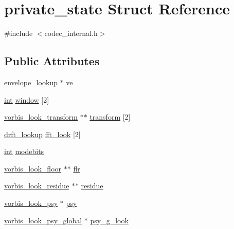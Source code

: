\hypertarget{structprivate__state}{}\section{private\+\_\+state Struct Reference}
\label{structprivate__state}


{\ttfamily \#include $<$codec\+\_\+internal.\+h$>$}

\subsection*{Public Attributes}
\begin{DoxyCompactItemize}
\item 
\hyperlink{structenvelope__lookup}{envelope\+\_\+lookup} $\ast$ \hyperlink{structprivate__state_ad7979389aacc2e53e24e8d96325809ac}{ve}
\item 
\hyperlink{xmltok_8h_a5a0d4a5641ce434f1d23533f2b2e6653}{int} \hyperlink{structprivate__state_af9be5f1a2c234d8fed9119b44b691876}{window} \mbox{[}2\mbox{]}
\item 
\hyperlink{codec__internal_8h_aa6baacf2249071bb7fbccedb526ea4bb}{vorbis\+\_\+look\+\_\+transform} $\ast$$\ast$ \hyperlink{structprivate__state_a1fefdab944d5992d2c837df7420ae0c3}{transform} \mbox{[}2\mbox{]}
\item 
\hyperlink{structdrft__lookup}{drft\+\_\+lookup} \hyperlink{structprivate__state_a81d78d1c72db43db2ddbc245444e4cfe}{fft\+\_\+look} \mbox{[}2\mbox{]}
\item 
\hyperlink{xmltok_8h_a5a0d4a5641ce434f1d23533f2b2e6653}{int} \hyperlink{structprivate__state_a3178cdb14e6be6dc5673637d187f8a7b}{modebits}
\item 
\hyperlink{codec__internal_8h_af4cb27874fc2abb2b43a025d7a3c900a}{vorbis\+\_\+look\+\_\+floor} $\ast$$\ast$ \hyperlink{structprivate__state_a760c8e735e944bff53e1cddba407b128}{flr}
\item 
\hyperlink{codec__internal_8h_a88a17b2922962e44ed846e09a212d0f0}{vorbis\+\_\+look\+\_\+residue} $\ast$$\ast$ \hyperlink{structprivate__state_a4a336f98a934f3810f0cba19a597bb45}{residue}
\item 
\hyperlink{structvorbis__look__psy}{vorbis\+\_\+look\+\_\+psy} $\ast$ \hyperlink{structprivate__state_a26015e60330f92d6d303c0db9c712287}{psy}
\item 
\hyperlink{structvorbis__look__psy__global}{vorbis\+\_\+look\+\_\+psy\+\_\+global} $\ast$ \hyperlink{structprivate__state_a1e3418326bf4a86cad24212d9af52b3d}{psy\+\_\+g\+\_\+look}
$$
\end{DoxyCompactItemize}
